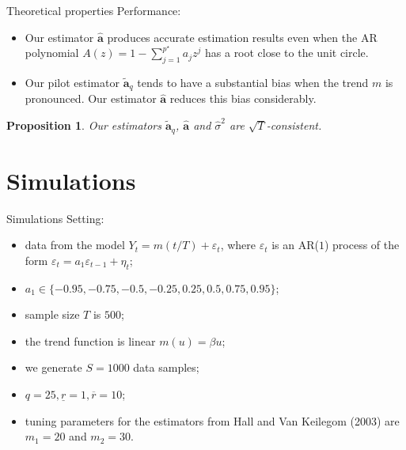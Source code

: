 \documentclass[10pt]{beamer}
\newtheorem{prop}{Proposition}
\begin{document}
\begin{frame}{Theoretical properties}
Performance:
\begin{itemize}
\item Our estimator $\widehat{\boldsymbol{a}}$ produces accurate estimation results even when the AR polynomial $A(z) = 1 - \sum_{j=1}^{p^\star} a_j z^j$ has a root close to the unit circle.\pause
\item Our pilot estimator $\widetilde{\boldsymbol{a}}_q$ tends to have a substantial bias when the trend $m$ is pronounced. Our estimator $\widehat{\boldsymbol{a}}$ reduces this bias considerably.\pause
\end{itemize}
\begin{prop}{}
Our estimators $\widetilde{\boldsymbol{a}}_q$, $\widehat{\boldsymbol{a}}$ and $\widehat{\sigma}^2$ are $\sqrt{T}$-consistent. 
\end{prop}
\end{frame}

\section{Simulations}

\begin{frame}{Simulations}
Setting:
\begin{itemize}
\item data from the model $Y_t = m(t/T) + \varepsilon_t$, where $\varepsilon_t$ is an AR($1$) process of the form $\varepsilon_t = a_1 \varepsilon_{t-1} + \eta_t$;
\item $a_1 \in \{ -0.95, -0.75, -0.5, -0.25, 0.25, 0.5, 0.75, 0.95\}$;
\item sample size $T$ is $500$;
\item the trend function is linear $m(u) = \beta u$;
\item we generate $S = 1000$ data samples;
\item $q=25, \underline{r} = 1, \overline{r} = 10$;
\item tuning parameters for the estimators from Hall and Van Keilegom (2003) are $m_1 = 20$ and $m_2 = 30$. 
\end{itemize}

\end{frame}
\end{document}
